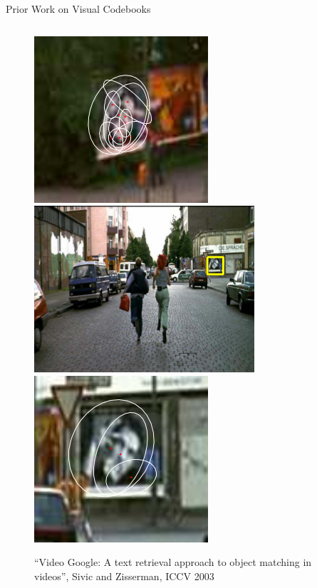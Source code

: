 \documentclass[mathserif]{beamer}
\begin{document}
\begin{frame}{Prior Work on Visual Codebooks}
\begin{columns}
\begin{column}{.5\textwidth}
\begin{figure}
                \includegraphics[width=.4\textwidth]{illustrations/related_work/video_google/query_1_small}\\
                \includegraphics[width=.4\textwidth]{illustrations/related_work/video_google/query_2_large}
                \includegraphics[width=.4\textwidth]{illustrations/related_work/video_google/query_2_small}
                \caption{``Video Google: A text retrieval approach to object matching in videos'', Sivic and Zisserman, ICCV 2003}
            \end{figure}
        \end{column}
    \end{columns}
\end{frame}
\end{document}
